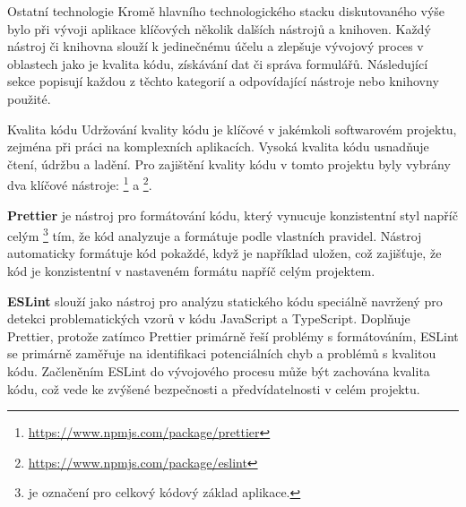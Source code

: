 \begin{subsection}{Ostatní technologie}
    \label{subsec:implementace-technologie-ostatni}
    Kromě hlavního technologického stacku diskutovaného výše bylo při vývoji aplikace klíčových několik dalších nástrojů a knihoven.
    Každý nástroj či knihovna slouží k jedinečnému účelu a zlepšuje vývojový proces v oblastech jako je kvalita kódu, získávání dat či správa formulářů.
    Následující sekce popisují každou z těchto kategorií a odpovídající nástroje nebo knihovny použité.

    \begin{subsubsection}{Kvalita kódu}
        \label{subsubsec:implementace-technologie-ostatni-kvalita}
        Udržování kvality kódu je klíčové v jakémkoli softwarovém projektu, zejména při práci na komplexních aplikacích.
        Vysoká kvalita kódu usnadňuje čtení, údržbu a ladění.
        Pro zajištění kvality kódu v tomto projektu byly vybrány dva klíčové nástroje: \footnote{\url{https://www.npmjs.com/package/prettier}} a \footnote{\url{https://www.npmjs.com/package/eslint}}.

        \textbf{Prettier} je nástroj pro formátování kódu, který vynucuje konzistentní styl napříč celým \footnote{ je označení pro celkový kódový základ aplikace.} tím, že kód analyzuje a formátuje podle vlastních pravidel.
        Nástroj automaticky formátuje kód pokaždé, když je například uložen, což zajišťuje, že kód je konzistentní v nastaveném formátu napříč celým projektem\cite{p__prettier_io}.

        \textbf{ESLint} slouží jako nástroj pro analýzu statického kódu speciálně navržený pro detekci problematických vzorů v kódu JavaScript a TypeScript.
        Doplňuje Prettier, protože zatímco Prettier primárně řeší problémy s formátováním, ESLint se primárně zaměřuje na identifikaci potenciálních chyb a problémů s kvalitou kódu.
        Začleněním ESLint do vývojového procesu může být zachována kvalita kódu, což vede ke zvýšené bezpečnosti a předvídatelnosti v celém projektu\cite{e__eslint_org}.
    \end{subsubsection}


\end{subsection}
